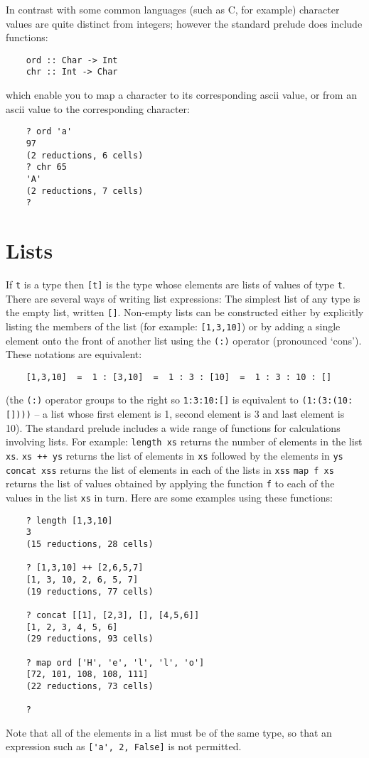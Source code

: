 \EQ
In contrast with  some  common  languages  (such  as  C,  for  example)
character values are quite distinct from integers; however the standard
prelude does include functions:
\begin{verbatim}
    ord :: Char -> Int
    chr :: Int -> Char
\end{verbatim}
which enable you to map a character to its corresponding  {\sc ascii}  value,
or from an {\sc ascii} value to the corresponding character:
\begin{verbatim}
    ? ord 'a'
    97
    (2 reductions, 6 cells)
    ? chr 65
    'A'
    (2 reductions, 7 cells)
    ?         
\end{verbatim}

\section{Lists}
If \verb"t" is a type then \verb"[t]" 
is the type whose elements are lists of  values
of type \verb"t".
There are several ways of writing list expressions:
\BI
\IT   The simplest list of any type is the empty list, written \verb"[]".
\IT   Non-empty lists  can be constructed either by  explicitly listing
      the members of the list (for example: \verb"[1,3,10]") or  by  adding  a
      single element onto the front  of  another  list  using  the  \verb"(:)"
      operator (pronounced `cons').  These notations are equivalent:
\begin{verbatim}
    [1,3,10]  =  1 : [3,10]  =  1 : 3 : [10]  =  1 : 3 : 10 : []
\end{verbatim}
      (the \verb"(:)" operator groups to the right so 
      \verb"1:3:10:[]"  is
      equivalent to \verb"(1:(3:(10:[])))" -- a list whose first element is 1,
      second element is 3 and last element is 10).
\EI
The  standard  prelude  includes  a  wide  range   of   functions   for
calculations involving lists.  For example:
\BSI
\IT  \verb"length xs"  returns the number of elements in the list \verb"xs".
\IT  \verb"xs ++ ys"   returns the list of elements in \verb"xs" followed by the
                elements in \verb"ys"
\IT  \verb"concat xss" returns the list of elements in each of the lists in
                \verb"xss"
\IT  \verb"map f xs"   returns the list of values obtained by applying the
                function \verb"f" to each of the values in the 
                list \verb"xs" in turn.
\ESI
Here are some examples using these functions:
\begin{verbatim}
    ? length [1,3,10]
    3
    (15 reductions, 28 cells)

    ? [1,3,10] ++ [2,6,5,7]
    [1, 3, 10, 2, 6, 5, 7]
    (19 reductions, 77 cells)

    ? concat [[1], [2,3], [], [4,5,6]]
    [1, 2, 3, 4, 5, 6]
    (29 reductions, 93 cells)

    ? map ord ['H', 'e', 'l', 'l', 'o']
    [72, 101, 108, 108, 111]
    (22 reductions, 73 cells)

    ?
\end{verbatim}
Note that all of the elements in a list must be of the  same  type,  so
that an expression such as \verb"['a', 2, False]" is not permitted.

